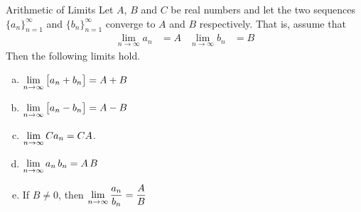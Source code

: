 \begin{frame}
\label{note3.1a}
\begin{block}{Arithmetic of Limits}
  Let $A$, $B$ and $C$ be real numbers and let the two sequences
$\big\{a_n\big\}_{n=1}^\infty$ and  $\big\{b_n\big\}_{n=1}^\infty$
converge to $A$ and $B$ respectively. That is, assume that
 \begin{align*}
  \lim_{n \to \infty} a_n&=A & \lim_{n \to \infty} b_n &=B
\end{align*}
  Then the following limits hold.
\begin{enumerate}[(a)]
 \item $\displaystyle \lim_{n \to \infty} \big[a_n+b_n\big] = A+B$
 \item $\displaystyle \lim_{n \to \infty} \big[a_n-b_n\big] = A-B$
\item $\displaystyle \lim_{n \to \infty} C a_n = C A$.
\item $\displaystyle \lim_{n \to \infty} a_n\,b_n = A\,B$
\item If $B \neq 0$, then $\displaystyle \lim_{n \to \infty}\frac{a_n}{b_n} = \frac{A}{B}$
\end{enumerate}
\end{block}

\end{frame}

